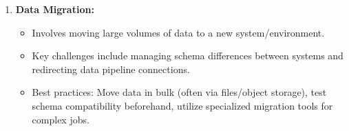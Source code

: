 \begin{enumerate}
    \item \textbf{Data Migration:}
    \begin{itemize}[label=\textbullet]
        \item Involves moving large volumes of data to a new system/environment.
        \item Key challenges include managing schema differences between systems and redirecting data pipeline connections.
        \item Best practices: Move data in bulk (often via files/object storage), test schema compatibility beforehand, utilize specialized migration tools for complex jobs.
    \end{itemize}
\end{enumerate}







